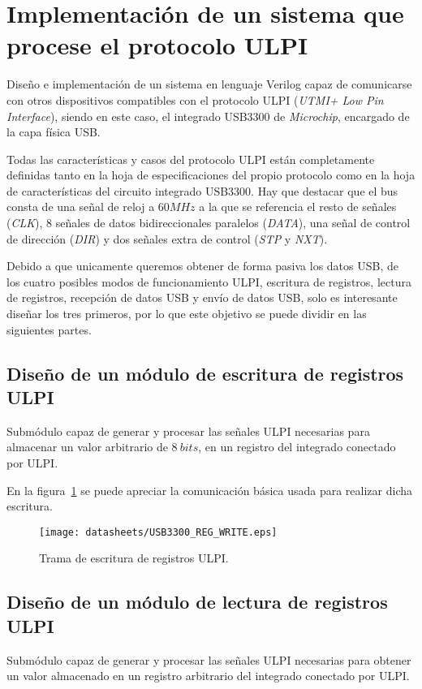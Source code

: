 \section{Implementación de un sistema que procese el protocolo ULPI}
Diseño e implementación de un sistema en lenguaje Verilog capaz de comunicarse con otros dispositivos compatibles con el protocolo ULPI (\emph{UTMI+ Low Pin Interface}), siendo en este caso, el integrado USB3300 de \emph{Microchip}, encargado de la capa física USB.

Todas las características y casos del protocolo ULPI están completamente definidas tanto en la hoja de especificaciones del propio protocolo\cite{ulpi-specs} como en la hoja de características del circuito integrado USB3300\cite{microchip:usb3300}. Hay que destacar que el bus consta de una señal de reloj a $60MHz$ a la que se referencia el resto de señales (\emph{CLK}), 8 señales de datos bidireccionales paralelos (\emph{DATA}), una señal de control de dirección (\emph{DIR}) y dos señales extra de control (\emph{STP} y \emph{NXT}).

Debido a que unicamente queremos obtener de forma pasiva los datos USB, de los cuatro posibles modos de funcionamiento ULPI, escritura de registros, lectura de registros, recepción de datos USB y envío de datos USB, solo es interesante diseñar los tres primeros, por lo que este objetivo se puede dividir en las siguientes partes.

\subsection{Diseño de un módulo de escritura de registros ULPI}
Submódulo capaz de generar y procesar las señales ULPI necesarias para almacenar un valor arbitrario de $8~bits$, en un registro del integrado conectado por ULPI.

En la figura~\ref{fig:ULPI_REG_WRITE} se puede apreciar la comunicación básica usada para realizar dicha escritura.
\begin{figure}[hbt]
    \centering
    \texttt{[image: datasheets/USB3300\_REG\_WRITE.eps]}
    \caption{Trama de escritura de registros ULPI.}
    \label{fig:ULPI_REG_WRITE}
\end{figure}

\subsection{Diseño de un módulo de lectura de registros ULPI}
Submódulo capaz de generar y procesar las señales ULPI necesarias para obtener un valor almacenado en un registro arbitrario del integrado conectado por ULPI.

